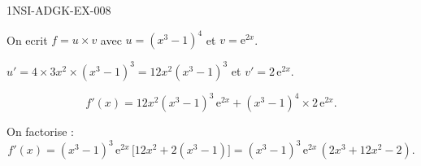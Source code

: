 \begin{corrige}{1NSI-ADGK-EX-008}

On ecrit $f = u \times v$ avec $u = (x^3-1)^4$ et $v = \mathrm{e}^{2x}$.


$u' = 4 \times 3x^2 \times (x^3-1)^3 = 12x^2(x^3-1)^3$ et $v' = 2\,\mathrm{e}^{2x}$.

\[ f'(x) = 12x^2(x^3-1)^3\,\mathrm{e}^{2x} + (x^3-1)^4 \times 2\,\mathrm{e}^{2x}. \]

On factorise :
\[ f'(x) = (x^3-1)^3\,\mathrm{e}^{2x}\,\bigl[12x^2 + 2(x^3-1)\bigr] = (x^3-1)^3\,\mathrm{e}^{2x}\,(2x^3+12x^2-2). \]

\end{corrige}
